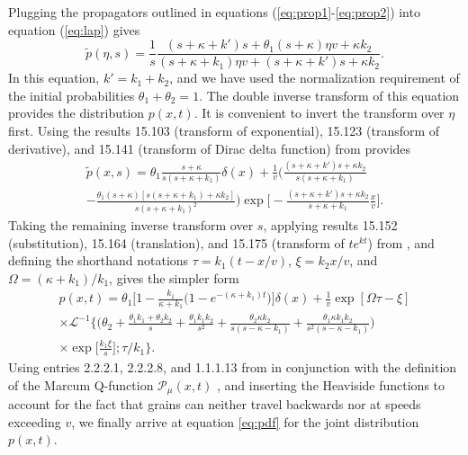 \documentclass[]{agujournal2018}
\newcommand\be{\begin{equation}}
\newcommand\ee{\end{equation}}
\newcommand\tp{\tilde{p}}
\newcommand\El{\mathcal{L}}
\begin{document}
Plugging the propagators outlined in equations (\ref{eq:prop1}-\ref{eq:prop2}) into equation (\ref{eq:lap}) gives 
\be \tilde{p}(\eta,s) = \frac{1}{s}\frac{(s+\kappa + k')s  + \theta_1(s+\kappa )\eta v+ \kappa k_2}{(s+\kappa+k_1)\eta v+(s+\kappa+k')s + \kappa k_2}.\label{eq:nicedist}\ee
In this equation, $k'=k_1+k_2$, and we have used the normalization requirement of the initial probabilities $\theta_1 + \theta_2 = 1.$
The double inverse transform of this equation provides the distribution $p(x,t)$.
It is convenient to invert the transform over $\eta$ first.
Using the results 15.103 (transform of exponential), 15.123 (transform of derivative), and 15.141 (transform of Dirac delta function) from \citet{Arfken1985} provides 
\begin{multline} \tp(x,s) = \theta_1 \frac{s+\kappa}{s(s+\kappa + k_1)}\delta(x) + \frac{1}{v} \Big(\frac{(s+\kappa+k')s+\kappa k_2}{s(s+\kappa+k_1)} \\- \frac{\theta_1(s+\kappa)[s(s+\kappa+k_1)+\kappa k_2]}{s(s+\kappa+k_1)^2}\Big)
\exp\Big[-\frac{(s+\kappa+k')s+\kappa k_2}{s+\kappa+k_1}\frac{x}{v}\Big].\end{multline}
Taking the remaining inverse transform over $s$, applying results 15.152 (substitution), 15.164 (translation), and 15.175 (transform of $te^{kt}$) from \citet{Arfken1985}, and defining the shorthand notations $\tau = k_1(t-x/v)$, $\xi = k_2 x/v$, and $\Omega = (\kappa + k_1)/k_1$, gives the simpler form 
\begin{multline}
p(x,t) = \theta_1\Big[1-\frac{k_1}{\kappa + k_1}\big(1-e^{-(\kappa + k_1)t}\big)\Big]\delta(x) + \frac{1}{v}\exp[\Omega \tau - \xi]\\
\times \El^{-1}\Big\{\Big( \theta_2 + \frac{\theta_1k_1+\theta_2 k_2}{s}+\frac{\theta_1k_1k_2}{s^2} + \frac{\theta_2\kappa k_2}{s(s-\kappa-k_1)} + \frac{\theta_1\kappa k_1 k_2}{s^2(s-\kappa-k_1)}\Big)\\
\times\exp\big[\frac{k_1 \xi}{s}\big];\tau/k_1\Big\}.
\end{multline}
Using entries 2.2.2.1, 2.2.2.8, and 1.1.1.13 from \citet{Prudnikov1992a} in conjunction with the definition of the Marcum Q-function $ \mathcal{P}_\mu(x,t)$ \citep[e.g.][]{Temme1996}, and inserting the Heaviside functions to account for the fact that grains can neither travel backwards nor at speeds exceeding $v$, we finally arrive at equation \ref{eq:pdf} for the joint distribution $p(x,t)$.
\end{document}
